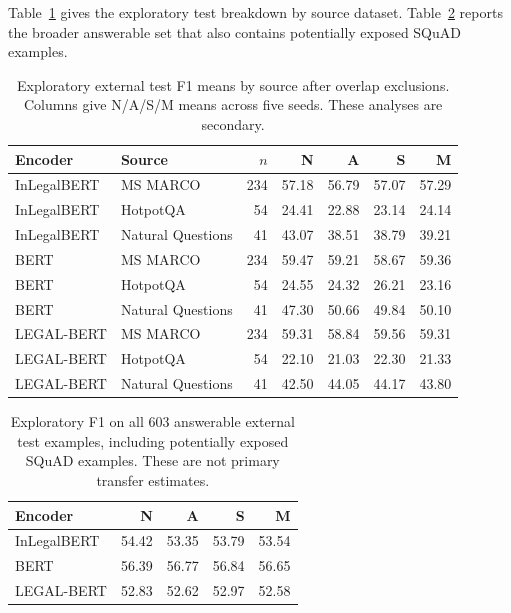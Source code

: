 \documentclass[pdflatex,sn-basic]{sn-jnl}
\begin{document}
Table~\ref{tab:legalqaeval_sources} gives the exploratory test breakdown by
source dataset. Table~\ref{tab:legalqaeval_all_answerable} reports the broader
answerable set that also contains potentially exposed SQuAD examples.

\begin{table}[!htbp]
\caption{Exploratory external test F1 means by source after overlap exclusions.
Columns give N/A/S/M means across five seeds. These analyses are secondary.}
\label{tab:legalqaeval_sources}
\centering\scriptsize
\begin{tabular}{@{}llrrrrr@{}}
\toprule
Encoder & Source & $n$ & N & A & S & M \\
\midrule
InLegalBERT & MS MARCO & 234 & 57.18 & 56.79 & 57.07 & 57.29 \\
InLegalBERT & HotpotQA & 54 & 24.41 & 22.88 & 23.14 & 24.14 \\
InLegalBERT & Natural Questions & 41 & 43.07 & 38.51 & 38.79 & 39.21 \\
BERT & MS MARCO & 234 & 59.47 & 59.21 & 58.67 & 59.36 \\
BERT & HotpotQA & 54 & 24.55 & 24.32 & 26.21 & 23.16 \\
BERT & Natural Questions & 41 & 47.30 & 50.66 & 49.84 & 50.10 \\
LEGAL-BERT & MS MARCO & 234 & 59.31 & 58.84 & 59.56 & 59.31 \\
LEGAL-BERT & HotpotQA & 54 & 22.10 & 21.03 & 22.30 & 21.33 \\
LEGAL-BERT & Natural Questions & 41 & 42.50 & 44.05 & 44.17 & 43.80 \\
\bottomrule
\end{tabular}
\end{table}

\begin{table}[!htbp]
\caption{Exploratory F1 on all 603 answerable external test examples,
including potentially exposed SQuAD examples. These are not primary transfer estimates.}
\label{tab:legalqaeval_all_answerable}
\centering\small
\begin{tabular}{@{}lrrrr@{}}
\toprule
Encoder & N & A & S & M \\
\midrule
InLegalBERT & 54.42 & 53.35 & 53.79 & 53.54 \\
BERT & 56.39 & 56.77 & 56.84 & 56.65 \\
LEGAL-BERT & 52.83 & 52.62 & 52.97 & 52.58 \\
\bottomrule
\end{tabular}
\end{table}
\end{document}
